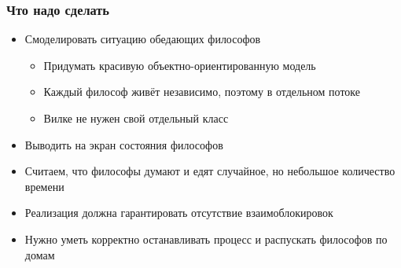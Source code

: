 \documentclass{../../slides-style}
\begin{document}
    \begin{frame}
        \frametitle{Что надо сделать}
        \begin{itemize}
            \item Смоделировать ситуацию обедающих философов
            \begin{itemize}
                \item Придумать красивую объектно-ориентированную модель
                \item Каждый философ живёт независимо, поэтому в отдельном потоке
                \item Вилке не нужен свой отдельный класс
            \end{itemize}
            \item Выводить на экран состояния философов
            \item Считаем, что философы думают и едят случайное, но небольшое количество времени
            \item Реализация должна гарантировать отсутствие взаимоблокировок
            \item Нужно уметь корректно останавливать процесс и распускать философов по домам
        \end{itemize}
    \end{frame}
\end{document}

